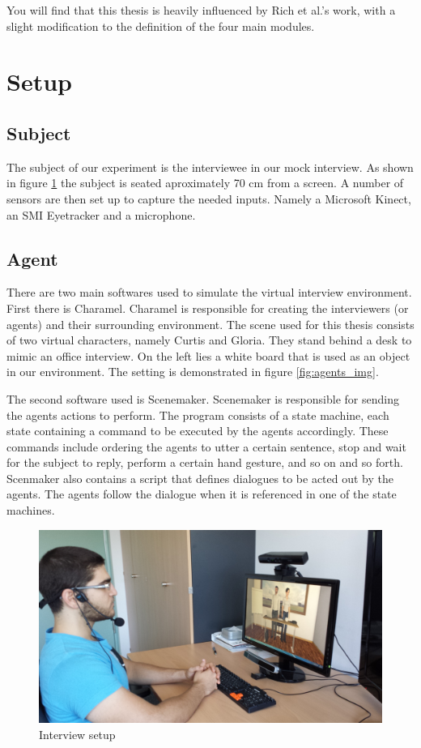 \documentclass[12pt, a4paper, fleqn]{memoir}%
\begin{document}
You will find that this thesis is heavily influenced by Rich et al.'s work, with a slight modification to the definition of the four main modules.

\section{Setup}
\label{sec:Section}

\subsection{Subject}
\label{subsec:Subject}
The subject of our experiment is the interviewee in our mock interview. As shown in figure \ref{fig:setup_img} the subject is seated aproximately 70 cm from a screen. A number of sensors are then set up to capture the needed inputs. Namely a Microsoft Kinect, an SMI Eyetracker and a microphone.

\subsection{Agent}
\label{subsec:Agent}
There are two main softwares used to simulate the virtual interview environment. First there is Charamel. Charamel is responsible for creating the interviewers (or agents) and their surrounding environment. The scene used for this thesis consists of two virtual characters, namely Curtis and Gloria. They stand behind a desk to mimic an office interview. On the left lies a white board that is used as an object in our environment. The setting is demonstrated in figure \ref{fig:agents_img}.

The second software used is Scenemaker. Scenemaker is responsible for sending the agents actions to perform. The program consists of a state machine, each state containing a command to be executed by the agents accordingly. These commands include ordering the agents to utter a certain sentence, stop and wait for the subject to reply, perform a certain hand gesture, and so on and so forth. Scenmaker also contains a script that defines dialogues to be acted out by the agents. The agents follow the dialogue when it is referenced in one of the state machines.

\begin{figure}[h!]
    \centering
    \includegraphics[width=1\textwidth]{setup}
    \caption{Interview setup}
    \label{fig:setup_img}
\end{figure}
\end{document}
